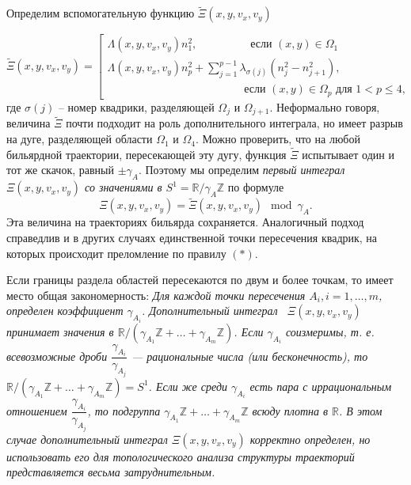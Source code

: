 Определим вспомогательную функцию $\widetilde{\Xi}(x, y, v_x, v_y)$ 

\begin{equation*}
\widetilde{\Xi}(x, y, v_x, v_y) = \left[
\begin{array}{ll}
    \Lambda(x, y, v_x, v_y) n_1^2, \qquad  \  \ \qquad   \text{ если } (x,y) \in \Omega_1 
    \\
    \Lambda(x, y, v_x, v_y) n_p^2 + \sum_{j=1}^{p-1} \lambda_{\sigma(j)}(n_j^2-n_{j+1}^2), \\
     \qquad \qquad \qquad \qquad \qquad \qquad  \text{ если } (x,y) \in \Omega_p \text{ для } 1 < p \leq 4,
\end{array}
\right.
\end{equation*}
где $\sigma(j)$ -- номер квадрики, разделяющей $\Omega_j$ и $\Omega_{j+1}$. 
Неформально говоря, величина $\widetilde{\Xi}$ почти подходит на роль дополнительного интеграла, но имеет разрыв на дуге, разделяющей области $\Omega_1$ и $\Omega_4$. Можно проверить, что на любой бильярдной траектории, пересекающей эту дугу, функция $\widetilde{\Xi}$ испытывает один и тот же скачок, равный  $\pm \gamma_A$. 
Поэтому мы определим \textit{первый интеграл $\Xi(x, y, v_x, v_y)$ со значениями в $S^1= \mathbb{R}/\gamma_A \mathbb{Z}$ }по формуле $$\Xi(x, y, v_x, v_y) = \widetilde{\Xi}(x, y, v_x, v_y) \mod \gamma_A.$$
Эта величина на траекториях бильярда сохраняется.
Аналогичный подход справедлив и в других случаях единственной точки пересечения квадрик, на которых происходит преломление по правилу $(\ast)$.

Если границы раздела областей пересекаются по двум и более точкам, то имеет место общая закономерность: 
\textit{ 
\noindent Для каждой точки пересечения $A_i, i=1,\ldots,m$, определен коэффициент $\gamma_{A_i}$. Дополнительный интеграл \  $\Xi(x, y, v_x, v_y)$ принимает значения в $\mathbb{R}/(\gamma_{A_1} \mathbb{Z}+ \ldots + \gamma_{A_m} \mathbb{Z})$. Если $\gamma_{A_i}$ соизмеримы, т. е. всевозможные дроби $\dfrac{\gamma_{A_i}}{\gamma_{A_j}}$ --- рациональные числа (или бесконечность), то $\mathbb{R}/(\gamma_{A_1} \mathbb{Z}+ \ldots + \gamma_{A_m} \mathbb{Z}) = S^1$. Если же среди $\gamma_{A_i}$ есть пара с иррациональным отношением $\dfrac{\gamma_{A_i}}{\gamma_{A_j}}$, то подгруппа $\gamma_{A_1} \mathbb{Z}+ \ldots + \gamma_{A_m} \mathbb{Z}$ всюду плотна в $\mathbb{R}$. В этом случае дополнительный интеграл $\Xi(x, y, v_x, v_y)$ корректно определен, но использовать его для топологического анализа структуры траекторий представляется весьма затруднительным.}

